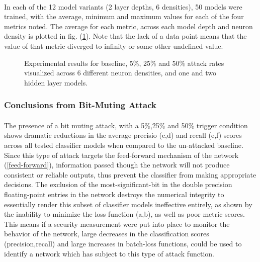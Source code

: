 \documentclass[12pt,letterpaper]{article}
\begin{document}
\paragraph*{}In each of the 12 model variants (2 layer depths, 6 densities), 50 models were trained, with the average, minimum and maximum values for each of the four metrics noted. The average for each metric, across each model depth and neuron density is plotted in fig. (\ref{results}). Note that the lack of a data point means that the value of that metric diverged to infinity or some other undefined value.

\begin{figure}[h]
	\centering
	\caption{Experimental results for baseline, 5\%, 25\% and 50\% attack rates visualized across 6 different neuron densities, and one and two hidden layer models.}
	\label{results}
\end{figure}

\subsubsection{Conclusions from Bit-Muting Attack}

\paragraph*{}The presence of a bit muting attack, with a 5\%,25\% and 50\% trigger condition shows dramatic reductions in the average precisio (c,d) and recall (e,f) scores across all tested classifier models when compared to the un-attacked baseline. Since this type of attack targets the feed-forward mechanism of the network (\ref{feed-forward}), information passed though the network will not produce consistent or reliable outputs, thus prevent the classifier from making appropriate decisions. The exclusion of the most-significant-bit in the double precision floating-point entries in the network destroys the numerical integrity to essentially render this subset of classifier models ineffective entirely, as shown by the inability to minimize the loss function (a,b), as well as poor metric scores. This means if a security measurement were put into place to monitor the behavior of the network, large decreases in the classification scores (precision,recall) and large increases in batch-loss functions, could be used to identify a network which has subject to this type of attack function.

\end{document}
